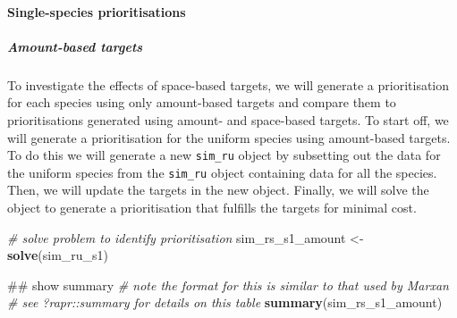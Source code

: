 \documentclass[11pt,]{article}
\newenvironment{Shaded}{\begin{snugshade}}{\end{snugshade}}
\newcommand{\KeywordTok}[1]{\textcolor[rgb]{0.13,0.29,0.53}{\textbf{{#1}}}}
\newcommand{\DataTypeTok}[1]{\textcolor[rgb]{0.13,0.29,0.53}{{#1}}}
\newcommand{\FloatTok}[1]{\textcolor[rgb]{0.00,0.00,0.81}{{#1}}}
\newcommand{\StringTok}[1]{\textcolor[rgb]{0.31,0.60,0.02}{{#1}}}
\newcommand{\CommentTok}[1]{\textcolor[rgb]{0.56,0.35,0.01}{\textit{{#1}}}}
\newcommand{\OtherTok}[1]{\textcolor[rgb]{0.56,0.35,0.01}{{#1}}}
\newcommand{\NormalTok}[1]{{#1}}
\begin{document}
\paragraph{Single-species
prioritisations}\label{single-species-prioritisations}

\subparagraph{Amount-based targets}\label{amount-based-targets}

To investigate the effects of space-based targets, we will generate a
prioritisation for each species using only amount-based targets and
compare them to prioritisations generated using amount- and space-based
targets. To start off, we will generate a prioritisation for the uniform
species using amount-based targets. To do this we will generate a new
\texttt{sim\_ru} object by subsetting out the data for the uniform
species from the \texttt{sim\_ru} object containing data for all the
species. Then, we will update the targets in the new object. Finally, we
will solve the object to generate a prioritisation that fulfills the
targets for minimal cost.

\begin{Shaded}
\end{Shaded}

\begin{Shaded}
\begin{Highlighting}[]
\CommentTok{# solve problem to identify prioritisation}
\NormalTok{sim_rs_s1_amount <-}\StringTok{ }\KeywordTok{solve}\NormalTok{(sim_ru_s1)}
\end{Highlighting}
\end{Shaded}

\begin{Shaded}
\begin{Highlighting}[]
\NormalTok{## show summary}
\CommentTok{# note the format for this is similar to that used by Marxan}
\CommentTok{# see ?rapr::summary for details on this table}
\KeywordTok{summary}\NormalTok{(sim_rs_s1_amount)}
\end{Highlighting}
\end{Shaded}
\end{document}
